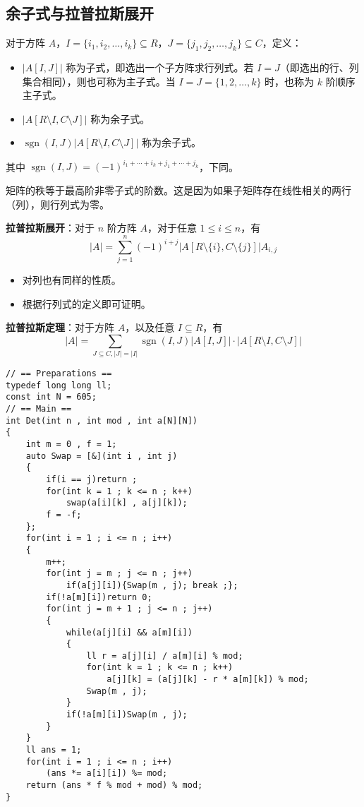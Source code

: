 \subsection{余子式与拉普拉斯展开}

\begin{tcolorbox}
    对于方阵 $A$，$I=\{i_1,i_2,\ldots,i_k\}\subseteq R$，$J=\{j_1,j_2,\ldots,j_k\}\subseteq C$，定义：

    \begin{itemize}
        \item $|A[I,J]|$ 称为子式，即选出一个子方阵求行列式。若 $I=J$（即选出的行、列集合相同），则也可称为主子式。当 $I=J=\{1,2,\ldots,k\}$ 时，也称为 $k$ 阶顺序主子式。
        \item $|A[R\setminus I,C\setminus J]|$ 称为余子式。
        \item $\operatorname{sgn}(I,J)|A[R\setminus I,C\setminus J]|$ 称为余子式。
    \end{itemize}
\end{tcolorbox}

其中 $\operatorname{sgn}(I,J)=(-1)^{i_1+\cdots+i_k+j_1+\cdots+j_k}$，下同。

矩阵的秩等于最高阶非零子式的阶数。这是因为如果子矩阵存在线性相关的两行（列），则行列式为零。

\begin{tcolorbox}
    \textbf{拉普拉斯展开}：对于 $n$ 阶方阵 $A$，对于任意 $1\le i\le n$，有
    $$|A|=\sum_{j=1}^{n} (-1)^{i+j}|A[R\setminus\{i\},C\setminus \{j\}]|A_{i,j}$$
\end{tcolorbox}
\begin{itemize}
    \item 对列也有同样的性质。
    \item 根据行列式的定义即可证明。
\end{itemize}

\begin{tcolorbox}
    \textbf{拉普拉斯定理}：对于方阵 $A$，以及任意 $I\subseteq R$，有
    $$|A|=\sum_{J\subseteq C,|J|=|I|} \operatorname{sgn}(I,J)|A[I,J]|\cdot|A[R\setminus I,C\setminus J]|$$
\end{tcolorbox}

\begin{verbatim}
// == Preparations ==
typedef long long ll;
const int N = 605;
// == Main ==
int Det(int n , int mod , int a[N][N])
{
    int m = 0 , f = 1;
    auto Swap = [&](int i , int j)
    {
        if(i == j)return ;
        for(int k = 1 ; k <= n ; k++)
            swap(a[i][k] , a[j][k]);
        f = -f;
    };
    for(int i = 1 ; i <= n ; i++)
    {
        m++;
        for(int j = m ; j <= n ; j++)
            if(a[j][i]){Swap(m , j); break ;};
        if(!a[m][i])return 0;
        for(int j = m + 1 ; j <= n ; j++)
        {
            while(a[j][i] && a[m][i])
            {
                ll r = a[j][i] / a[m][i] % mod;
                for(int k = 1 ; k <= n ; k++)
                    a[j][k] = (a[j][k] - r * a[m][k]) % mod;
                Swap(m , j);
            }
            if(!a[m][i])Swap(m , j);
        }
    }
    ll ans = 1;
    for(int i = 1 ; i <= n ; i++)
        (ans *= a[i][i]) %= mod;
    return (ans * f % mod + mod) % mod;
}
\end{verbatim}